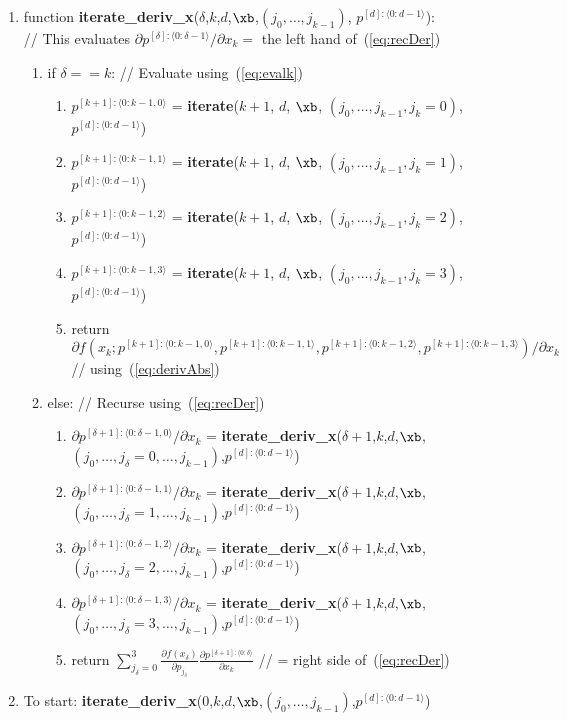 \documentclass[11pt]{article}
\begin{document}
\begin{enumerate}
\item function \textbf{iterate\_deriv\_x}($\delta$,$k$,$d$,$\xb$,$(j_0, \dots, j_{k-1})$, $p^{[d]:\langle 0:d-1 \rangle}$): \\
// This evaluates $\partial p^{[\delta]: \langle 0:\delta-1 \rangle} / \partial x_k = $ the left hand of~(\ref{eq:recDer})
\begin{enumerate}
\item if $\delta == k$: // Evaluate using~(\ref{eq:evalk})
\begin{enumerate}
\item $p^{[k+1]: \langle 0:k-1,0 \rangle}$ = \textbf{iterate}($k+1$, $d$, $\xb$, $(j_{0}, \dots, j_{k-1}, j_k=0)$, $p^{[d]:\langle 0:d-1 \rangle}$)
\item $p^{[k+1]: \langle 0:k-1,1 \rangle}$ = \textbf{iterate}($k+1$, $d$, $\xb$, $(j_{0}, \dots, j_{k-1}, j_k=1)$, $p^{[d]:\langle 0:d-1 \rangle}$)
\item $p^{[k+1]: \langle 0:k-1,2 \rangle}$ = \textbf{iterate}($k+1$, $d$, $\xb$, $(j_{0}, \dots, j_{k-1}, j_k=2)$, $p^{[d]:\langle 0:d-1 \rangle}$)
\item $p^{[k+1]: \langle 0:k-1,3 \rangle}$ = \textbf{iterate}($k+1$, $d$, $\xb$, $(j_{0}, \dots, j_{k-1}, j_k=3)$, $p^{[d]:\langle 0:d-1 \rangle}$)
\item return $\partial
f \left ( 
x_{k} ; 
p^{[k+1]: \langle 0:k-1,0 \rangle},
p^{[k+1]: \langle 0:k-1,1 \rangle},
p^{[k+1]: \langle 0:k-1,2 \rangle},
p^{[k+1]: \langle 0:k-1,3 \rangle}
\right ) 
/
\partial x_k
$ // using~(\ref{eq:derivAbs})
\end{enumerate}
\item else: // Recurse using~(\ref{eq:recDer})
\begin{enumerate}
\item $\partial p^{[\delta+1]: \langle 0:\delta-1,0 \rangle} / \partial x_k$ = \textbf{iterate\_deriv\_x}($\delta+1$,$k$,$d$,$\xb$,$(j_0, \dots, j_{\delta} = 0,\dots, j_{k-1})$,$p^{[d]:\langle 0:d-1 \rangle}$)
\item $\partial p^{[\delta+1]: \langle 0:\delta-1,1 \rangle} / \partial x_k$ = \textbf{iterate\_deriv\_x}($\delta+1$,$k$,$d$,$\xb$,$(j_0, \dots, j_{\delta} = 1,\dots, j_{k-1})$,$p^{[d]:\langle 0:d-1 \rangle}$)
\item $\partial p^{[\delta+1]: \langle 0:\delta-1,2 \rangle} / \partial x_k$ = \textbf{iterate\_deriv\_x}($\delta+1$,$k$,$d$,$\xb$,$(j_0, \dots, j_{\delta} = 2,\dots, j_{k-1})$,$p^{[d]:\langle 0:d-1 \rangle}$)
\item $\partial p^{[\delta+1]: \langle 0:\delta-1,3 \rangle} / \partial x_k$ = \textbf{iterate\_deriv\_x}($\delta+1$,$k$,$d$,$\xb$,$(j_0, \dots, j_{\delta} = 3,\dots, j_{k-1})$,$p^{[d]:\langle 0:d-1 \rangle}$)
\item return $
\sum_{j_\delta=0}^3 
\frac{
\partial f(x_\delta)
}{
\partial p_{j_\delta}
}
\frac{\partial p^{[\delta+1]: \langle 0:\delta \rangle}
}{
\partial x_k
}
$ // = right side of~(\ref{eq:recDer})
\end{enumerate}
\end{enumerate}

\item To start: \textbf{iterate\_deriv\_x}($0$,$k$,$d$,$\xb$,$(j_0, \dots, j_{k-1})$,$p^{[d]:\langle 0:d-1 \rangle}$)
\end{enumerate}
\end{document}
